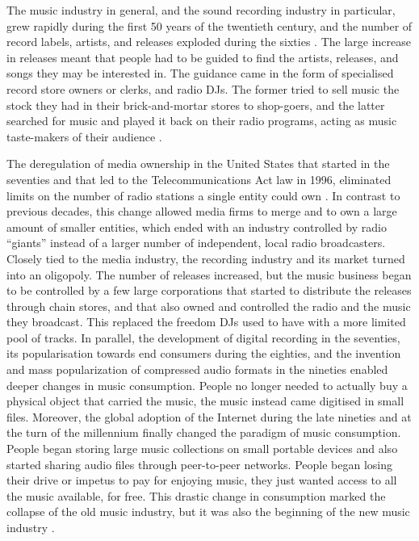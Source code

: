 The music industry in general, and the sound recording industry in particular, grew rapidly during the first 50 years of the twentieth century, and the number of record labels, artists, and releases exploded during the sixties \autocite{wikstrom13music}. The large increase in releases meant that people had to be guided to find the artists, releases, and songs they may be interested in. The guidance came in the form of specialised record store owners or clerks, and radio DJs. The former tried to sell music the stock they had in their brick-and-mortar stores to shop-goers, and the latter searched for music and played it back on their radio programs, acting as music taste-makers of their audience \autocite{razlogova13past}. %



The deregulation of media ownership in the United States  that started in the seventies and that led to the Telecommunications Act law in 1996, eliminated limits on the number of radio stations a single entity could own \autocite{williams02radio}. In contrast to previous decades, this change allowed media firms to merge and to own a large amount of smaller entities, which ended with an industry controlled by radio ``giants''  instead of a larger number of independent, local radio broadcasters. Closely tied to the media industry, the recording industry and its market turned into an oligopoly. %
The number of releases increased, but the music business began to be controlled by a few large corporations that started to distribute the releases through chain stores, and that also owned and controlled the radio and the music they broadcast. This replaced the freedom DJs used to have with a more limited pool of tracks.
In parallel, the development of digital recording in the seventies, its popularisation towards end consumers during the eighties, and the invention and mass popularization of compressed audio formats in the nineties enabled deeper changes in music consumption. 
People no longer needed to actually buy a physical object that carried the music, the music instead came digitised in small files. Moreover, the global adoption of the Internet during the late nineties and at the turn of the millennium finally changed the paradigm of music consumption. People began storing large music collections on small portable devices and also started sharing audio files through peer-to-peer networks. 
People began losing their drive or impetus to pay for enjoying music, they just wanted access to all the music available, for free. This drastic change in consumption marked the collapse of the old music industry, but it was also the beginning of the new music industry \autocite{wikstrom13music}. 

